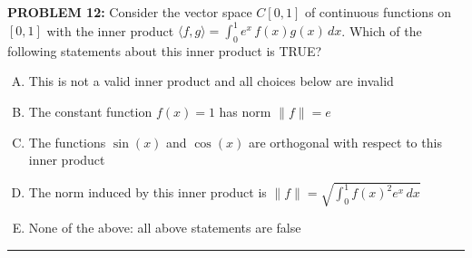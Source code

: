 \documentclass[12pt]{amsart}
\newcommand{\divider}{
  \vspace{-1em} %
  \noindent
  \raisebox{-0.15ex}{\textbullet}%
  \hspace{0.5em}%
  \rule[0.5ex]{0.95\textwidth}{1.0pt}%
  \hspace{0.5em}%
  \raisebox{-0.15ex}{\textbullet}%
  \vspace{0em} %
}
\begin{document}
\newpage

{\bf PROBLEM 12:}
Consider the vector space $C[0,1]$ of continuous functions on $[0,1]$ with the inner product $\langle f, g \rangle = \int_0^1 e^x\,f(x)g(x)\,dx$.
Which of the following statements about this inner product is TRUE?
%
\begin{enumerate}[(A)]
\item This is not a valid inner product and all choices below are invalid
\item The constant function $f(x) = 1$ has norm $\|f\| = e$
\item The functions $\sin(x)$ and $\cos(x)$ are orthogonal with respect to this inner product
\item The norm induced by this inner product is $\|f\| = \sqrt{\int_0^1 f(x)^2 e^x\,dx}$
\item None of the above: all above statements are false
\end{enumerate}
%
%
\divider
\end{document}

